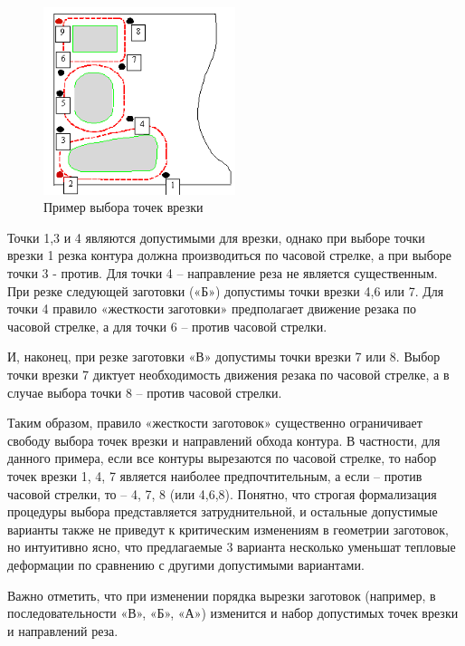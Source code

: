 \documentclass{article}
\begin{document}
\begin{figure}
  \begin{center}
  \includegraphics[width=0.5\textwidth]{part-hardness.png}
  \caption{Пример выбора точек врезки}
  \label{part-hardness}
  \end{center}
\end{figure}

Точки 1,3 и 4 являются допустимыми для врезки,
однако при выборе точки врезки 1 резка контура
должна производиться по часовой стрелке,
а при выборе точки 3 - против.
Для точки 4 – направление реза не является существенным.
При резке следующей заготовки («Б»)
допустимы точки врезки 4,6 или 7.
Для точки 4 правило «жесткости заготовки»
предполагает движение резака по часовой стрелке,
а для точки 6 – против часовой стрелки.

И, наконец, при резке заготовки «В»
допустимы точки врезки 7 или 8.
Выбор точки врезки 7 диктует необходимость
движения резака по часовой стрелке,
а в случае выбора точки 8 – против часовой стрелки.

Таким образом, правило «жесткости заготовок»
существенно ограничивает свободу выбора точек
врезки и направлений обхода контура.
В частности, для данного примера,
если все контуры вырезаются по часовой стрелке,
то набор точек врезки 1, 4, 7
является наиболее предпочтительным,
а если – против часовой стрелки, то – 4, 7, 8
(или 4,6,8).
Понятно, что строгая формализация процедуры
выбора представляется затруднительной,
и остальные допустимые варианты также не приведут
к критическим изменениям в геометрии заготовок,
но интуитивно ясно, что предлагаемые 3 варианта
несколько уменьшат тепловые деформации по сравнению
с другими допустимыми вариантами.

Важно отметить,
что при изменении порядка вырезки заготовок
(например, в последовательности «В», «Б», «А»)
изменится и набор допустимых точек врезки и направлений реза.
\end{document}
